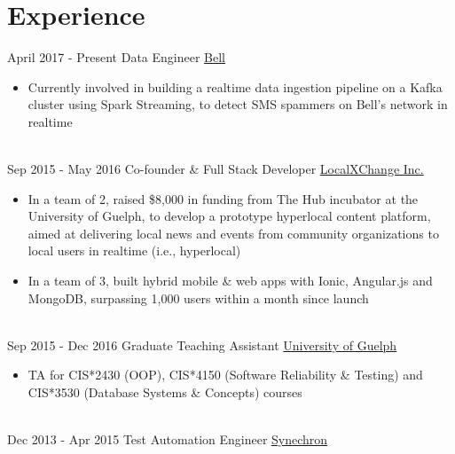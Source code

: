 \documentclass[a4paper]{tenseconds} %
\begin{document}

\section{Experience}

\begin{twenty} %
\twentyitem
        {April 2017 -}
        {Present}
        {Data Engineer}
        {\href{http://www.bell.ca/}{Bell}}
        {}
        {\begin{itemize}
        \item Currently involved in building a realtime data ingestion pipeline on a Kafka cluster using Spark Streaming, to detect SMS spammers on Bell's network in realtime
        \end{itemize}}
        \\
    \twentyitem
        {Sep 2015 -}
        {May 2016}
        {Co-founder \& Full Stack Developer}
        {\href{http://www.localxchange.ca/}{LocalXChange Inc.}}
        {}
        {
        {\begin{itemize}
        \item In a team of 2, raised \$8,000 in funding from The Hub incubator at the University of Guelph, to develop a prototype hyperlocal content platform, aimed at delivering local news and events from community organizations to local users in realtime (i.e., hyperlocal)
        \item In a team of 3, built hybrid mobile \& web apps with Ionic, Angular.js and MongoDB, surpassing 1,000 users within a month since launch
    \end{itemize}}
        }
    \\   
    \twentyitem
        {Sep 2015 -}
        {Dec 2016}
        {Graduate Teaching Assistant}
        {\href{http://www.uoguelph.ca}{University of Guelph}}
        {}
        {
        {\begin{itemize}
        \item TA for CIS*2430 (OOP), CIS*4150 (Software Reliability \& Testing) and CIS*3530 (Database Systems \& Concepts) courses
    \end{itemize}}
        }
     \\
     \twentyitem
        {Dec 2013 -}
        {Apr 2015}
        {Test Automation Engineer}
        {\href{http://www.synechron.com/}{Synechron}}

\end{twenty}
\end{document}
